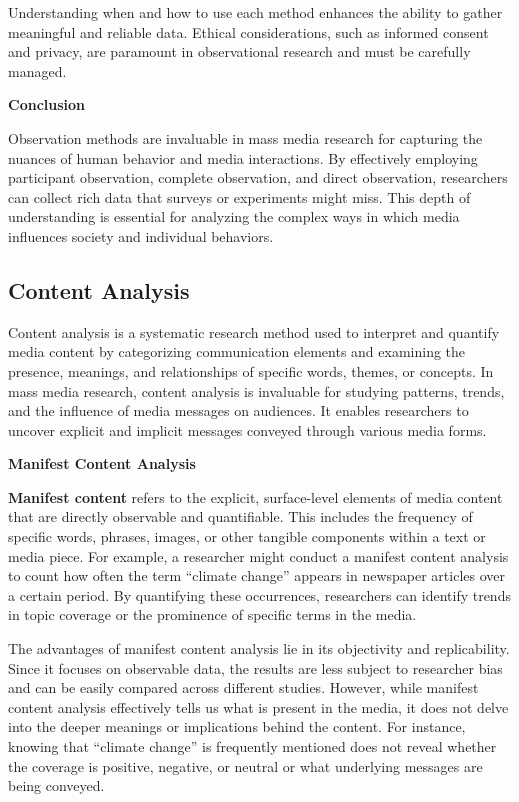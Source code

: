 \documentclass[
]{book}
\begin{document}
Understanding when and how to use each method enhances the ability to gather meaningful and reliable data. Ethical considerations, such as informed consent and privacy, are paramount in observational research and must be carefully managed.

\textbf{Conclusion}

Observation methods are invaluable in mass media research for capturing the nuances of human behavior and media interactions. By effectively employing participant observation, complete observation, and direct observation, researchers can collect rich data that surveys or experiments might miss. This depth of understanding is essential for analyzing the complex ways in which media influences society and individual behaviors.

\subsection*{Content Analysis}\label{content-analysis}

Content analysis is a systematic research method used to interpret and quantify media content by categorizing communication elements and examining the presence, meanings, and relationships of specific words, themes, or concepts. In mass media research, content analysis is invaluable for studying patterns, trends, and the influence of media messages on audiences. It enables researchers to uncover explicit and implicit messages conveyed through various media forms.

\textbf{Manifest Content Analysis}

\textbf{Manifest content} refers to the explicit, surface-level elements of media content that are directly observable and quantifiable. This includes the frequency of specific words, phrases, images, or other tangible components within a text or media piece. For example, a researcher might conduct a manifest content analysis to count how often the term ``climate change'' appears in newspaper articles over a certain period. By quantifying these occurrences, researchers can identify trends in topic coverage or the prominence of specific terms in the media.

The advantages of manifest content analysis lie in its objectivity and replicability. Since it focuses on observable data, the results are less subject to researcher bias and can be easily compared across different studies. However, while manifest content analysis effectively tells us what is present in the media, it does not delve into the deeper meanings or implications behind the content. For instance, knowing that ``climate change'' is frequently mentioned does not reveal whether the coverage is positive, negative, or neutral or what underlying messages are being conveyed.
\end{document}
